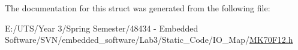 The documentation for this struct was generated from the following file\+:\begin{DoxyCompactItemize}
\item 
E\+:/\+U\+T\+S/\+Year 3/\+Spring Semester/48434 -\/ Embedded Software/\+S\+V\+N/embedded\+\_\+software/\+Lab3/\+Static\+\_\+\+Code/\+I\+O\+\_\+\+Map/\hyperlink{_m_k70_f12_8h}{M\+K70\+F12.\+h}\end{DoxyCompactItemize}
